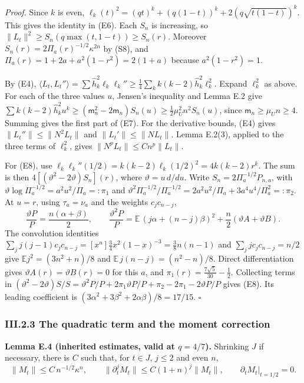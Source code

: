 \documentclass[
  british,
  10pt,
]{article}
\begin{document}
\emph{Proof.} Since \(k\) is even,
\(\ell_k(t)^2=(qt)^k+(q(1-t))^k+2(q\sqrt{t(1-t)})^k\). This gives the
identity in (E6). Each \(S_n\) is increasing, so
\(\|L_t\|^2\ge S_n(q\max(t,1-t))\ge S_n(r)\). Moreover
\(S_n(r)=2\Pi_a(r)^{-1/2}\kappa^{2n}\) by (S8), and
\(\Pi_a(r)=1+2a+a^2(1-r^2)=2(1+a)\) because \(a^2(1-r^2)=1\).

By (E4),
\(\langle L_t,L_t''\rangle=\sum\hat h_k^2\ell_k\ell_k''\ge\frac14\sum_k k(k-2)\hat h_k^2\ell_k^2\).
Expand \(\ell_k^2\) as above. For each of the three values \(u\),
Jensen's inequality and Lemma E.2 give
\(\sum k(k-2)\hat h_k^2u^k\ge(\mathsf m_n^2-2\mathsf m_n)S_n(u)\ge\frac12\mu_U^2n^2S_n(u)\),
since \(\mathsf m_n\ge\mu_Un\ge4\). Summing gives the first part of
(E7). For the derivative bounds, (E4) gives \(\|L_t''\|\le\|N^2L_t\|\)
and \(\|L_t'\|\le\|NL_t\|\). Lemma E.2(3), applied to the three terms of
\(\ell_k^2\), gives \(\|N^pL_t\|\le Cn^p\|L_t\|\).

For (E8), use \(\ell_k\ell_k''(1/2)=k(k-2)\ell_k(1/2)^2=4k(k-2)r^k\).
The sum is then \(4[(\vartheta^2-2\vartheta)S_n](r)\), where
\(\vartheta=u\,d/du\). Write \(S_n=2\Pi_a^{-1/2}P_{n,a}\), with
\(\vartheta\log\Pi_a^{-1/2}=a^2u^2/\Pi_a=:\pi_1\) and
\(\vartheta^2\Pi_a^{-1/2}/\Pi_a^{-1/2}=2a^2u^2/\Pi_a+3a^4u^4/\Pi_a^2=:\pi_2\).
At \(u=r\), using \(\tau_a=\nu_a\) and the weights \(c_jc_{n-j}\), \[
\frac{\vartheta P}{P}=\frac{n(\alpha+\beta)}{2},\qquad
\frac{\vartheta^2P}{P}=\mathbb E\,(j\alpha+(n-j)\beta)^2+\frac n2(\vartheta A+\vartheta B).
\] The convolution identities
\(\sum_jj(j-1)c_jc_{n-j}=[x^n]\tfrac34x^2(1-x)^{-3}=\tfrac38n(n-1)\) and
\(\sum_jjc_jc_{n-j}=n/2\) give \(\mathbb Ej^2=(3n^2+n)/8\) and
\(\mathbb E\,j(n-j)=(n^2-n)/8\). Direct differentiation gives
\(\vartheta A(r)=\vartheta B(r)=0\) for this \(a\), and
\(\pi_1(r)=\frac{7\sqrt5}{30}-\frac12\). Collecting terms in
\((\vartheta^2-2\vartheta)S/S=\vartheta^2P/P+2\pi_1\vartheta P/P+\pi_2-2\pi_1-2\vartheta P/P\)
gives (E8). Its leading coefficient is
\((3\alpha^2+3\beta^2+2\alpha\beta)/8=17/15\). \(\square\)

\subsubsection{III.2.3 The quadratic term and the moment
correction}\label{iii.2.3-the-quadratic-term-and-the-moment-correction}

\textbf{Lemma E.4 (inherited estimates, valid at \(q=4/7\)).} Shrinking
\(J\) if necessary, there is \(C\) such that, for \(t\in J\), \(j\le2\)
and even \(n\), \[
\|M_t\|\le C\,n^{-1/2}\kappa^{n},\qquad
\|\partial_t^jM_t\|\le C(1+n)^j\|M_t\|,\qquad\partial_tM_t\big|_{t=1/2}=0 .
\tag{E9}
\]
\end{document}
